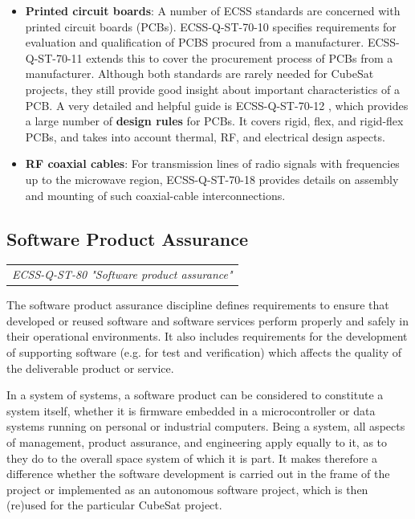 \begin{itemize}
\item \textbf{Printed circuit boards}:  A number of ECSS standards are concerned with printed circuit boards (PCBs). ECSS-Q-ST-70-10 \cite{ECSS-Q-ST-70-10} specifies requirements for evaluation and qualification of PCBS procured from a manufacturer. ECSS-Q-ST-70-11 \cite{ECSS-Q-ST-70-11} extends this to cover the procurement process of PCBs from a manufacturer. Although both standards are rarely needed for CubeSat projects, they still provide good insight about important characteristics of a PCB. A very detailed and helpful guide is ECSS-Q-ST-70-12 \cite{ECSS-Q-ST-70-12}, which provides a large number of \textbf{design rules} for PCBs. It covers rigid, flex, and rigid-flex PCBs, and takes into account thermal, RF, and electrical design aspects.
\item \textbf{RF coaxial cables}: For transmission lines of radio signals with frequencies up to the microwave region, ECSS-Q-ST-70-18 \cite{ECSS-Q-ST-70-18} provides details on assembly and mounting of such coaxial-cable interconnections.
\end{itemize}

\subsection{Software Product Assurance}

\begin{tabular}{l}
\textit{ECSS-Q-ST-80 "Software product assurance" \cite{ECSS-Q-ST-80}}
\end{tabular}

The software product assurance discipline defines requirements to ensure that developed or reused software and software services perform properly and safely in their operational environments. It also includes requirements for the development of supporting software (e.g. for test and verification) which affects the quality of the deliverable product or service.

In a system of systems, a software product can be considered to constitute a system itself, whether it is firmware embedded in a microcontroller or data systems running on personal or industrial computers. Being a system, all aspects of management, product assurance, and engineering apply equally to it, as to they do to the overall space system of which it is part. It makes therefore a difference whether the software development is carried out in the frame of the project or implemented as an autonomous software project, which is then (re)used for the particular CubeSat project.

